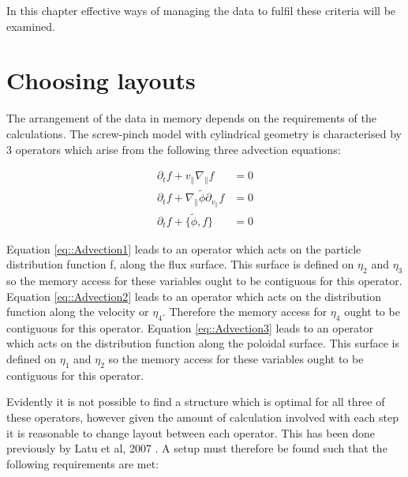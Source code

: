 In this chapter effective ways of managing the data to fulfil these criteria will be examined.

\section{Choosing layouts}

The arrangement of the data in memory depends on the requirements of the calculations. The screw-pinch model with cylindrical geometry is characterised by 3 operators which arise from the following three advection equations:

\begin{align}
 \partial_t f + v_\parallel \nabla_\parallel f &= 0 \label{eq::Advection1}\\
 \partial_t f + \nabla_\parallel \tilde{\phi} \partial_{v_{\parallel}} f &= 0 \label{eq::Advection2}\\
 \partial_t f + \{\tilde{\phi}, f\} &= 0 \label{eq::Advection3}
\end{align}

Equation \ref{eq::Advection1} leads to an operator which acts on the particle distribution function f, along the flux surface. This surface is defined on $\eta_2$ and $\eta_3$ so the memory access for these variables ought to be contiguous for this operator. Equation \ref{eq::Advection2} leads to an operator which acts on the distribution function along the velocity or $\eta_4$. Therefore  the memory access for $\eta_4$ ought to be contiguous for this operator. Equation \ref{eq::Advection3} leads to an operator which acts on the distribution function along the poloidal surface. This surface is defined on $\eta_1$ and $\eta_2$ so the memory access for these variables ought to be contiguous for this operator.

Evidently it is not possible to find a structure which is optimal for all three of these operators, however given the amount of calculation involved with each step it is reasonable to change layout between each operator. This has been done previously by Latu et al, 2007 \cite{Gysela5D}. A setup must therefore be found such that the following requirements are met:

